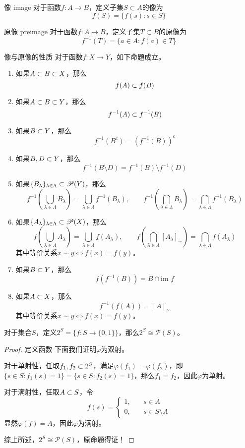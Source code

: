 \begin{definition}{像 image}
	对于函数$f:A\to B$，定义子集$S\subset A$的像为
	$$
	f(S)=\{ f(s):s\in S \}
	$$
\end{definition}

\begin{definition}{原像 preimage}
	对于函数$f:A\to B$，定义子集$T\subset B$的原像为
	$$
	f^{-1}(T)=\{ a\in A:f(a)\in T \}
	$$
\end{definition}

\begin{proposition}{像与原像的性质}
	对于函数$f:X\to Y$，如下命题成立。
	\begin{enumerate}
		\item 如果$A\subset B\subset X$，那么
		$$
		f(A)\subset f(B)
		$$
		\item 如果$A\subset B\subset Y$，那么
		$$
		f^{-1}(A)\subset f^{-1}(B)
		$$
		\item 如果$B\subset Y$，那么
		$$
		f^{-1}(B^c)=(f^{-1}(B))^c
		$$
		\item 如果$B,D\subset Y$，那么
		$$
		f^{-1}(B\setminus D)=f^{-1}(B)\setminus f^{-1}(D)
		$$
		\item 如果$\{ B_\lambda \}_{\lambda\in\Lambda}\subset\mathscr{P}(Y)$，那么
		$$
		f^{-1}\left( \bigcup_{\lambda\in\Lambda}B_\lambda \right)=\bigcup_{\lambda\in\Lambda}f^{-1}(B_\lambda),\qquad 
		f^{-1}\left( \bigcap_{\lambda\in\Lambda}B_\lambda \right)=\bigcap_{\lambda\in\Lambda}f^{-1}(B_\lambda)
		$$
		\item 如果$\{ A_\lambda \}_{\lambda\in\Lambda}\subset\mathscr{P}(X)$，那么
		$$
		f\left( \bigcup_{\lambda\in\Lambda}A_\lambda \right)=\bigcup_{\lambda\in\Lambda}f(A_\lambda),\qquad 
		f\left( \bigcap_{\lambda\in\Lambda}[A_\lambda]_\sim \right)=\bigcap_{\lambda\in\Lambda}f(A_\lambda)
		$$
		其中等价关系$x\sim y\iff f(x)=f(y)$。
		\item 如果$B\subset Y$，那么
		$$
		f(f^{-1}(B))=B\cap\text{im }f
		$$
		\item 如果$A\subset X$，那么
		$$
		f^{-1}(f(A))=[A]_\sim
		$$
		其中等价关系$x\sim y\iff f(x)=f(y)$。
	\end{enumerate}
\end{proposition}

\begin{proposition}
	对于集合$S$，定义$2^S=\{ f:S\to \{0,1\} \}$，那么$2^S\cong \mathscr{P}(S)$。
\end{proposition}

\begin{proof}
	定义函数
	下面我们证明$\varphi$为双射。
	
	对于单射性，任取$f_1,f_2\subset 2^S$，满足$\varphi(f_1)=\varphi(f_2)$，即$\{ s\in S:f_1(s)=1 \}=\{ s\in S:f_2(s)=1 \}$，那么$f_1=f_2$，因此$\varphi$为单射。
	
	对于满射性，任取$A\subset S$，令
	$$
	f(s)=\begin{cases}
		1,\quad & s\in A\\
		0,\quad & s\in S\setminus A
	\end{cases}
	$$
	显然$\varphi(f)=A$，因此$\varphi$为满射。
	
	综上所述，$2^S\cong \mathscr{P}(S)$，原命题得证！
\end{proof}

